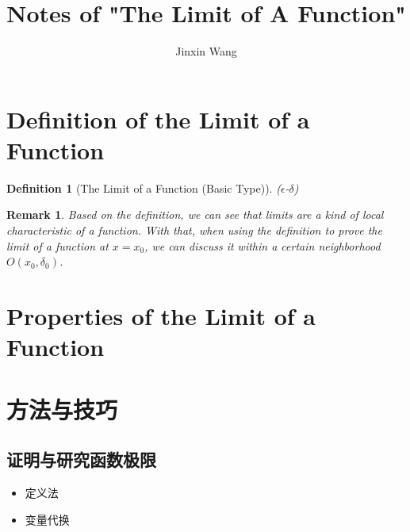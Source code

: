 \documentclass[onecolumn]{ctexart}
\title{Notes of "The Limit of A Function"}
\author{Jinxin Wang}
\date{}
\newtheorem{definition}{Definition}
\newtheorem{remark}{Remark}
\begin{document}
\maketitle

\section{Definition of the Limit of a Function}

\begin{definition}[The Limit of a Function (Basic Type)]
  ($\epsilon$-$\delta$)
\end{definition}

\begin{remark}
  Based on the definition, we can see that limits are a kind of local 
  characteristic of a function. With that, when using the definition to prove 
  the limit of a function at $x = x_0$, we can discuss it within a certain 
  neighborhood $O(x_0, \delta_0)$.
\end{remark}

\section{Properties of the Limit of a Function}

\section{方法与技巧}

\subsection{证明与研究函数极限}

\begin{itemize}
  \item 定义法
  \item 变量代换
\end{itemize}
\end{document}
